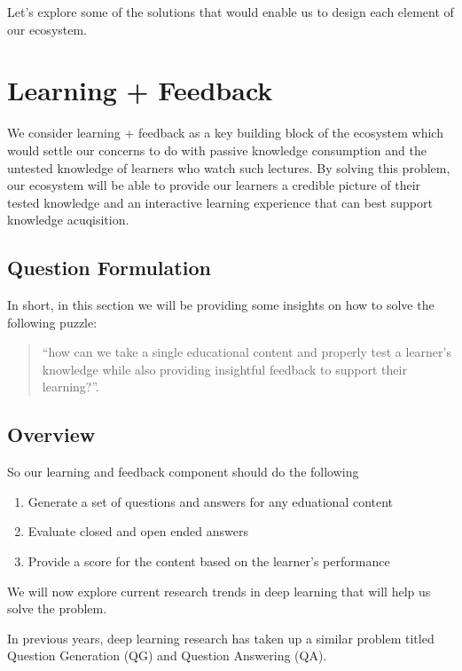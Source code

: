 \documentclass[]{book}
\theoremstyle{definition}
\theoremstyle{definition}
\theoremstyle{definition}
\theoremstyle{remark}
\begin{document}
Let's explore some of the solutions that would enable us to design each
element of our ecosystem.

\section{Learning + Feedback}\label{learning-feedback}

We consider learning + feedback as a key building block of the ecosystem
which would settle our concerns to do with passive knowledge consumption
and the untested knowledge of learners who watch such lectures. By
solving this problem, our ecosystem will be able to provide our learners
a credible picture of their tested knowledge and an interactive learning
experience that can best support knowledge acuqisition.

\subsection{Question Formulation}\label{question-formulation}

In short, in this section we will be providing some insights on how to
solve the following puzzle:

\begin{quote}
``how can we take a single educational content and properly test a
learner's knowledge while also providing insightful feedback to support
their learning?''.
\end{quote}

\subsection{Overview}\label{overview}

So our learning and feedback component should do the following

\begin{enumerate}
\def\labelenumi{\arabic{enumi}.}
\item
  Generate a set of questions and answers for any eduational content
\item
  Evaluate closed and open ended answers
\item
  Provide a score for the content based on the learner's performance
\end{enumerate}

We will now explore current research trends in deep learning that will
help us solve the problem.

In previous years, deep learning research has taken up a similar problem
titled Question Generation (QG) and Question Answering (QA).
\end{document}
